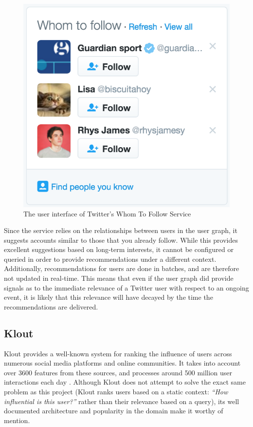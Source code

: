 \documentclass{l4proj}
\begin{document}
\begin{figure}[H]
\centering
\includegraphics[scale=0.75]{whomtofollow.png}
\caption{The user interface of Twitter's Whom To Follow Service}
\label{whomtofollow}
\end{figure}

Since the service relies on the relationships between users in the user graph, it suggests accounts similar to those that you already follow. While this provides excellent suggestions based on long-term interests, it cannot be configured or queried in order to provide recommendations under a different context. Additionally, recommendations for users are done in batches, and are therefore not updated in real-time. This means that even if the user graph did provide signals as to the immediate relevance of a Twitter user with respect to an ongoing event, it is likely that this relevance will have decayed by the time the recommendations are delivered.

\subsection{Klout}
Klout provides a well-known system for ranking the influence of users across numerous social media platforms and online communities. It takes into account over 3600 features from these sources, and processes around 500 million user interactions each day \cite{klout}. Although Klout does not attempt to solve the exact same problem as this project (Klout ranks users based on a static context: \textit{``How influential is this user?''} rather than their relevance based on a query), its well documented architecture and popularity in the domain make it worthy of mention.
\end{document}
